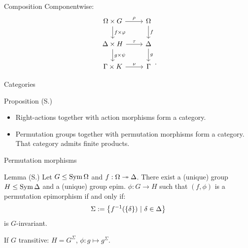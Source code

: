 \documentclass{beamer}
\theoremstyle{plain}
\theoremstyle{definition}
\begin{document}
\begin{frame}{Composition}
Componentwise:
\[
\begin{tikzcd}[ampersand replacement=\&]
    \Omega \times G
        \ar[r, "\rho"]
        \ar[d, "f \times \varphi"]
    \&
    \Omega
        \ar[d, "f"]
    \\
    \Delta \times H
        \ar[r, "\tau"]
        \ar[d, "g \times \psi"]
    \&
    \Delta
        \ar[d, "g"]
    \\
    \Gamma \times K
        \ar[r, "\nu"]
    \&
    \Gamma
\end{tikzcd}
\raisebox{-3em}{.}
\]
\end{frame}

\begin{frame}{Categories}
\begin{block}{Proposition (S.)}
\begin{itemize}
\item Right-actions together with action morphisms form a category.
\item
Permutation groups together with permutation morphisms form a category.
That category admits finite products.
\end{itemize}
\end{block}
\end{frame}


\begin{frame}{Permutation morphisms}
\begin{block}{Lemma (S.)}
Let $G \leq \operatorname{Sym} \Omega$ and $f : \Omega \twoheadrightarrow \Delta$.
There exist a (unique) group $H \leq \operatorname{Sym} \Delta$ and a (unique)
group epim. $\phi : G \to H$ such that
$(f, \phi)$ is a permutation epimorphism
if and only if:
\[
    \Sigma :=  \left\{  f ^ {-1}( \left\{ \delta \right\} ) ~|~ \delta \in \Delta  \right\} 
\]
is $G$-invariant.
\end{block}


\pause
If $G$ transitive: $H = G ^ \Sigma$, $\phi : g \mapsto g ^ \Sigma$.
\end{frame}


%
\end{document}
